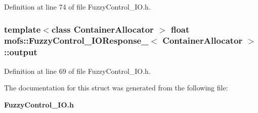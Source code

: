 Definition at line 74 of file Fuzzy\-Control\-\_\-\-I\-O.\-h.

\subsubsection[{output}]{\setlength{\rightskip}{0pt plus 5cm}template$<$class Container\-Allocator $>$ float {\bf mofs\-::\-Fuzzy\-Control\-\_\-\-I\-O\-Response\-\_\-}$<$ Container\-Allocator $>$\-::output}\label{structmofs_1_1FuzzyControl__IOResponse___ac5471a7e04482683f9b1802edb006c60}


Definition at line 69 of file Fuzzy\-Control\-\_\-\-I\-O.\-h.



The documentation for this struct was generated from the following file\-:\begin{DoxyCompactItemize}
\item 
{\bf Fuzzy\-Control\-\_\-\-I\-O.\-h}\end{DoxyCompactItemize}
